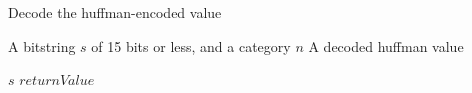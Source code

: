 \begin{algorithm}
  \caption{Decode the huffman-encoded value}
  \label{algDecodeHuffmanValue}
  \begin{algorithmic}
    \REQUIRE A bitstring $s$ of 15 bits or less, and a category $n$
    \ENSURE A decoded huffman value

      \RETURN $s$
    \ENDIF
    \RETURN $returnValue$
  \end{algorithmic}
\end{algorithm}
